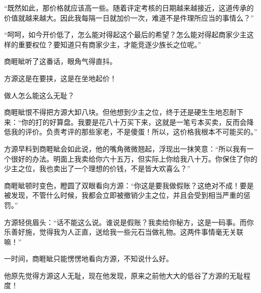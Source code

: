 \begin{this_body}
“既然如此，那价格就应该高一些。随着评定考核的日期越来越接近，这道传承的价值就越来越大。因此我每隔一日就加价一次，难道不是件理所应当的事情么？”

“呵呵，如今开价低了，怎么能对得起这个最后的希望？怎么能对得起商家少主这样的重要权位？要知道只有商家少主，才能竞逐少族长之位呢。”

商睚眦听了这番话，眼角气得直抖。

方源这是在要挟，这是在坐地起价！

做人怎么能这么无耻？

商睚眦恨不得把方源大卸八块。但他想到少主之位，终于还是硬生生地忍耐下来：“你的打的好算盘。我要是花八十万买下来，这就是一笔亏本买卖，反而会降低我的评价。负责考评的那些家老，不是傻蛋！所以，这价格我根本不可能买的。”

方源早料到商睚眦会如此说，他的嘴角微微翘起，浮现出一抹笑意：“所以我有一个很好的办法。明面上我卖给你六十五万，但实际上你给我八十万。你保住了你的少主之位，我也卖出了一个理想的价钱，不是皆大欢喜么？”

商睚眦顿时变色，瞪圆了双眼看向方源：“你这是要我做假账？这绝对不成！要是被发现，不管什么时候，我都会立即被撤销少主之位，并且会受到相当严重的惩罚。”

方源轻佻眉头：“话不能这么说。谁说是假账？我卖给你秘方，这是一码事。而你乐善好施，觉得我为人正直，送给我一些元石当做礼物。这两件事情毫无关联嘛！”

一时间，商睚眦只能愣愣地看向方源，不知说什么好。

他原先觉得方源这人无耻，现在他发现，原来之前他大大的低谷了方源的无耻程度！

\end{this_body}

